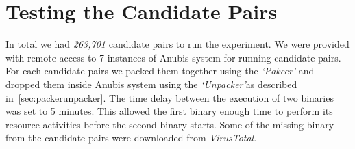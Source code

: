 \section{Testing the Candidate Pairs}
\label{sec:Testing the Candidate Pairs}
In total we had \emph{263,701} candidate pairs to run the experiment.
We were provided with remote access to 7 instances of Anubis system for running candidate pairs.
For each candidate pairs we packed them together using the \emph{`Pakcer'} and dropped them inside Anubis system using the \emph{`Unpacker'}as described in~\ref{sec:packerunpacker}.
The time delay between the execution of two binaries was set to 5 minutes.
This allowed the first binary enough time to perform its resource activities before the second binary starts.
Some of the missing binary from the candidate pairs were downloaded from \emph{VirusTotal}.
